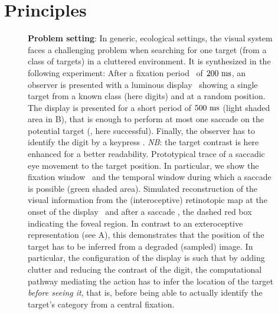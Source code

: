 \section*{Principles}
\label{sec:principles}

\begin{figure}[t!]%
	\caption{%
		{\bf Problem setting}: In generic, ecological settings, the visual system faces a challenging problem when searching for one target (from a class of targets) in a cluttered environment. It is synthesized in the following experiment: %
		\A After a fixation period \FIX\ of $200~\si{\milli\second}$, an observer is presented with a luminous display \DIS\ showing a single target from a known class (here digits) and at a random position. The display is presented for a short period of $500~\si{\milli\second}$ (light shaded area in B), that is enough to perform at most one saccade on the potential target (\SAC , here successful). Finally, the observer has to identify the digit by a keypress \ANS. \emph{NB}: the target contrast is here enhanced for a better readability. %
		\B Prototypical trace of a saccadic eye movement to the target position. In particular, we show the fixation window \FIX\ and the temporal window during which a saccade is possible (green shaded area). %
		\C Simulated reconstruction of the visual information from the (interoceptive) retinotopic map at the onset of the display \DIS\ and after a saccade \SAC , the dashed red box indicating the foveal region. In contrast to an exteroceptive representation (see A), this demonstrates that the position of the target has to be inferred from a degraded (sampled) image. In particular, the configuration of the display is such that by adding clutter and reducing the contrast of the digit, %
		the computational pathway mediating the action has to infer the location of the target \emph{before seeing it}, that is, before being able to actually identify the target's category from a central fixation. }%
		\label{fig:intro} %
\end{figure}%

